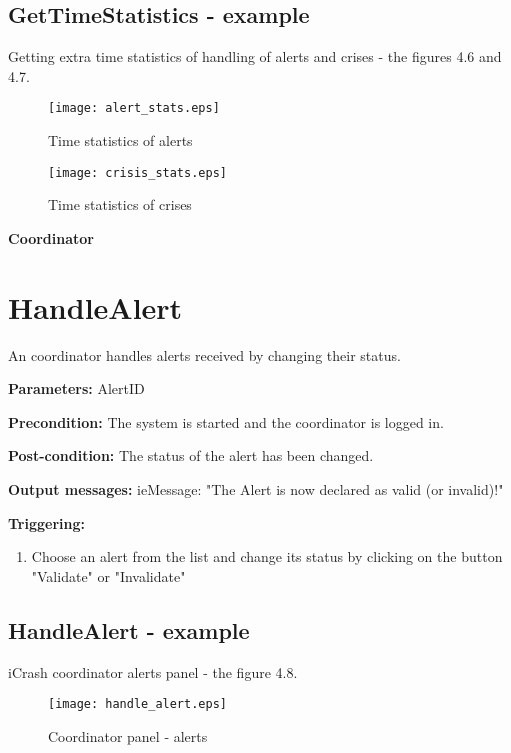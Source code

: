 \subsection{GetTimeStatistics - example}

Getting extra time statistics of handling of alerts and crises - the figures 4.6 and 4.7.

\begin{figure}[h]
    \texttt{[image: alert\_stats.eps]}
	\caption{Time statistics of alerts}
\end{figure}

\begin{figure}[h] 
    \texttt{[image: crisis\_stats.eps]}
	\caption{Time statistics of crises}
\end{figure}


\begin{center}
	{\bf \Large Coordinator}
\end{center}


\section{HandleAlert}
\label{operation:HandleAlert}

An coordinator handles alerts received by changing their status.

\begin{description}
	\item \textbf{Parameters:} AlertID 
	\item \textbf{Precondition:} The system is started and the coordinator is
	logged in. 
	\item \textbf{Post-condition:} The status of the alert has been changed.
	\item \textbf{Output messages:} ieMessage: "The Alert is now declared as valid
	(or invalid)!"
	
	\item \textbf{Triggering:}
	
	\begin{enumerate}
		\item Choose an alert from the list and change its status by clicking on the
		button "Validate" or "Invalidate"
	\end{enumerate}
\end{description}

\subsection{HandleAlert - example}
iCrash coordinator alerts panel - the figure 4.8.
\begin{figure}
    \texttt{[image: handle\_alert.eps]}
	\caption{Coordinator panel - alerts}
\end{figure}

